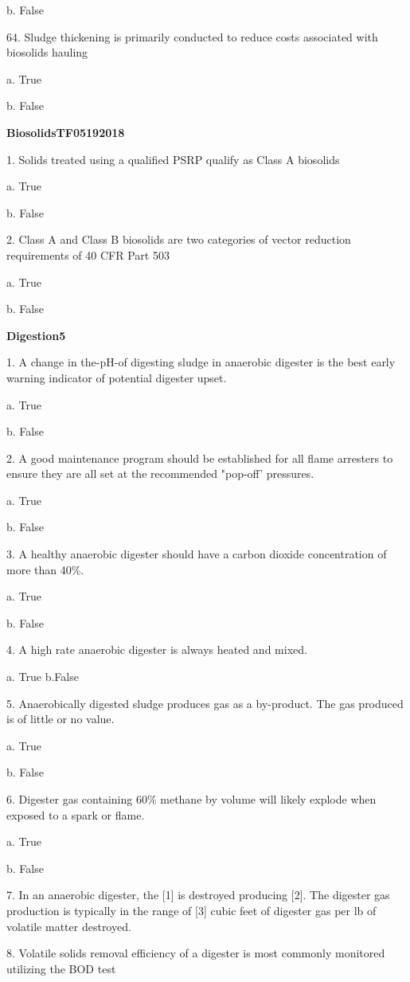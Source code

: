 \documentclass{article}
\begin{document}
b. False 


64. Sludge thickening is primarily conducted to reduce costs associated with biosolids hauling 

a. True 

b. False 

\textbf{BiosolidsTF05192018}

1. Solids treated using a qualified PSRP qualify as Class A biosolids 

a. True 

b. False 


2. Class A and Class B biosolids are two categories of vector reduction requirements of 40 CFR Part 503 

a. True 

b. False 


\textbf{Digestion5}

1. A change in the-pH-of digesting sludge in anaerobic digester is the best early warning indicator of potential digester upset. 

a. True 

b. False 


2. A good maintenance program should be established for all flame arresters to ensure they are all set at the recommended "pop-off' pressures. 

a. True 

b. False 


3. A healthy anaerobic digester should have a carbon dioxide concentration of more than 40\%. 

a. True 

b. False 


4. A high rate anaerobic digester is always heated and mixed. 

a. True
b.False 


5. Anaerobically digested sludge produces gas as a by-product. The gas produced is of little or no value. 

a. True 

b. False 


6. Digester gas containing 60\% methane by volume will likely explode when exposed to a spark or flame. 

a. True 

b. False 


7. In an anaerobic digester, the [1] is destroyed producing [2]. The digester gas production is typically in the range of [3] cubic feet of digester gas per lb of volatile matter destroyed. 


8. Volatile solids removal efficiency of a digester is most commonly monitored utilizing the BOD test
\end{document}
